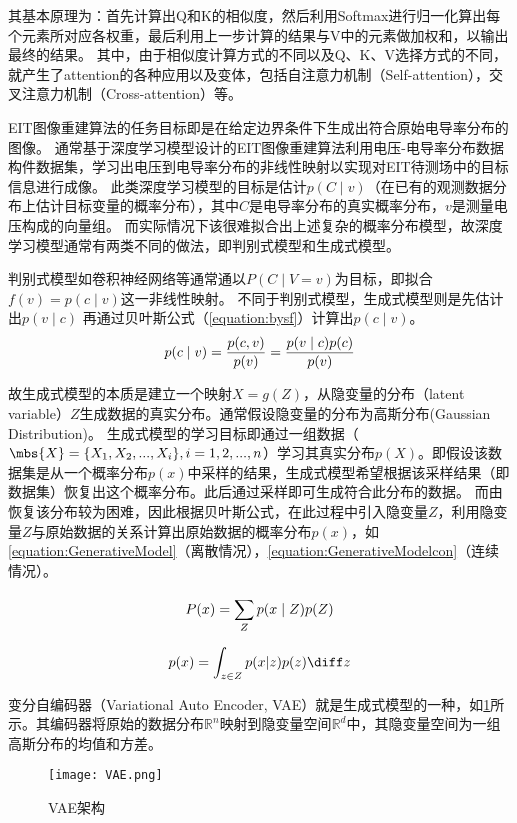 其基本原理为：首先计算出Q和K的相似度，然后利用Softmax进行归一化算出每个元素所对应各权重，最后利用上一步计算的结果与V中的元素做加权和，以输出最终的结果。
其中，由于相似度计算方式的不同以及Q、K、V选择方式的不同，就产生了attention的各种应用以及变体，包括自注意力机制（Self-attention），交叉注意力机制（Cross-attention）等。


EIT图像重建算法的任务目标即是在给定边界条件下生成出符合原始电导率分布的图像。
通常基于深度学习模型设计的EIT图像重建算法利用电压-电导率分布数据构件数据集，学习出电压到电导率分布的非线性映射以实现对EIT待测场中的目标信息进行成像。
此类深度学习模型的目标是估计$p(C \mid v)$（在已有的观测数据分布上估计目标变量的概率分布），其中$C$是电导率分布的真实概率分布，$v$是测量电压构成的向量组。
而实际情况下该很难拟合出上述复杂的概率分布模型，故深度学习模型通常有两类不同的做法，即判别式模型和生成式模型。

判别式模型如卷积神经网络等通常通以$P(C \mid V=v)$为目标，即拟合$f(v) = p(c \mid v)$这一非线性映射。
不同于判别式模型，生成式模型则是先估计出$p(v \mid c)$ 再通过贝叶斯公式（\cref{equation:bysf}）计算出$p(c \mid v)$。
\begin{equation}
  \centering
  \label{equation:bysf}
  p(c \mid v) = \frac{p(c, v)}{p(v)} = \frac{p(v \mid c)p(c)}{p(v)} 
\end{equation}

故生成式模型的本质是建立一个映射$X=g(Z)$，从隐变量的分布（latent variable）$Z$生成数据的真实分布。通常假设隐变量的分布为高斯分布(Gaussian Distribution)。
生成式模型的学习目标即通过一组数据（$\mbs{X} = \{X_1, X_2, ..., X_i\}, i = 1, 2, ..., n$）学习其真实分布$p(X)$。即假设该数据集是从一个概率分布$p(x)$中采样的结果，生成式模型希望根据该采样结果（即数据集）恢复出这个概率分布。此后通过采样即可生成符合此分布的数据。
而由恢复该分布较为困难，因此根据贝叶斯公式，在此过程中引入隐变量$Z$，利用隐变量$Z$与原始数据的关系计算出原始数据的概率分布$p(x)$，如\cref{equation:GenerativeModel}（离散情况），\cref{equation:GenerativeModelcon}（连续情况）。

\begin{equation}
  \centering
  \label{equation:GenerativeModel}
  P(x) = \sum_{Z}^{}p(x\mid Z)p(Z)
\end{equation}

\begin{equation}
  \centering
  \label{equation:GenerativeModelcon}
  p(x) = \int_{z \in Z}^{} p(x|z)p(z)\diff z
\end{equation}

变分自编码器（Variational Auto Encoder, VAE）就是生成式模型的一种，如\cref{figure:VAE}所示。其编码器将原始的数据分布$\mathbb{R}^n$映射到隐变量空间$\mathbb{R}^d$中，其隐变量空间为一组高斯分布的均值和方差。
\begin{figure}[h]
  \centering
  \texttt{[image: VAE.png]}
  \caption{VAE架构}
  \label{figure:VAE}
  \end{figure}

